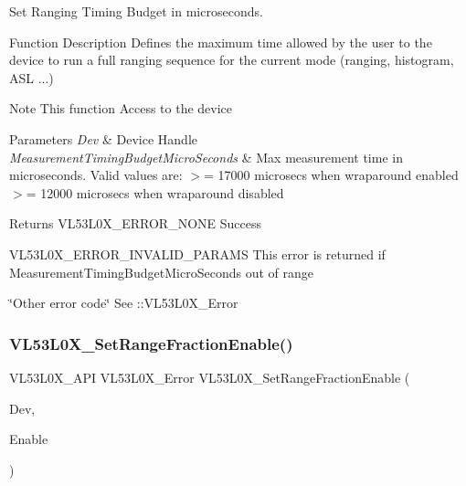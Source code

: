 Set Ranging Timing Budget in microseconds. 

\begin{DoxyParagraph}{Function Description}
Defines the maximum time allowed by the user to the device to run a full ranging sequence for the current mode (ranging, histogram, A\+SL ...)
\end{DoxyParagraph}
\begin{DoxyNote}{Note}
This function Access to the device
\end{DoxyNote}

\begin{DoxyParams}{Parameters}
{\em Dev} & Device Handle \\
\hline
{\em Measurement\+Timing\+Budget\+Micro\+Seconds} & Max measurement time in microseconds. Valid values are\+: $>$= 17000 microsecs when wraparound enabled $>$= 12000 microsecs when wraparound disabled \\
\hline
\end{DoxyParams}
\begin{DoxyReturn}{Returns}
V\+L53\+L0\+X\+\_\+\+E\+R\+R\+O\+R\+\_\+\+N\+O\+NE Success 

V\+L53\+L0\+X\+\_\+\+E\+R\+R\+O\+R\+\_\+\+I\+N\+V\+A\+L\+I\+D\+\_\+\+P\+A\+R\+A\+MS This error is returned if Measurement\+Timing\+Budget\+Micro\+Seconds out of range 

\char`\"{}\+Other error code\char`\"{} See \+::\+V\+L53\+L0\+X\+\_\+\+Error 
\end{DoxyReturn}
\mbox{\label{group__VL53L0X__parameters__group_ga8efed262abe1ceff56edf7b3faa9bd86}} 
\subsubsection{\texorpdfstring{V\+L53\+L0\+X\+\_\+\+Set\+Range\+Fraction\+Enable()}{VL53L0X\_SetRangeFractionEnable()}}
{\footnotesize\ttfamily V\+L53\+L0\+X\+\_\+\+A\+PI V\+L53\+L0\+X\+\_\+\+Error V\+L53\+L0\+X\+\_\+\+Set\+Range\+Fraction\+Enable (\begin{DoxyParamCaption}\item[{\hyperlink{group__VL53L0X__platform__group_ga2d6405308b1dd524b462f1b8fb97d167}{V\+L53\+L0\+X\+\_\+\+D\+EV}}]{Dev,  }\item[{\hyperlink{vl53l0x__types_8h_aba7bc1797add20fe3efdf37ced1182c5}{uint8\+\_\+t}}]{Enable }\end{DoxyParamCaption})}



